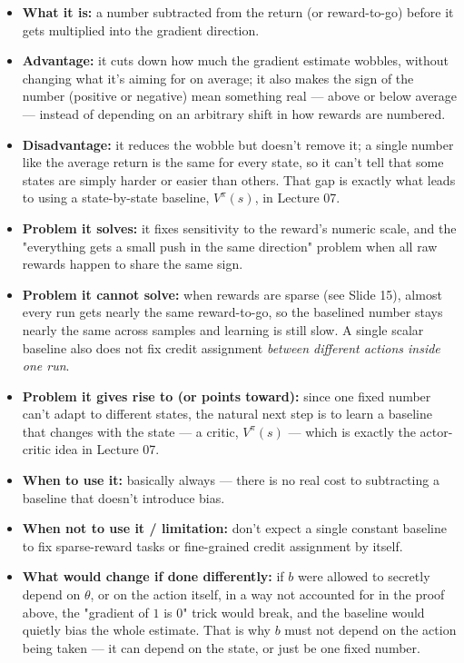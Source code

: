 \documentclass[11pt]{article}
\begin{document}
\begin{itemize}[leftmargin=*]
  \item \textbf{What it is:} a number subtracted from the return (or reward-to-go) before it gets multiplied into the gradient direction.
  \item \textbf{Advantage:} it cuts down how much the gradient estimate wobbles, without changing what it's aiming for on average; it also makes the sign of the number (positive or negative) mean something real --- above or below average --- instead of depending on an arbitrary shift in how rewards are numbered.
  \item \textbf{Disadvantage:} it reduces the wobble but doesn't remove it; a single number like the average return is the same for every state, so it can't tell that some states are simply harder or easier than others. That gap is exactly what leads to using a state-by-state baseline, $V^\pi(s)$, in Lecture 07.
  \item \textbf{Problem it solves:} it fixes sensitivity to the reward's numeric scale, and the "everything gets a small push in the same direction" problem when all raw rewards happen to share the same sign.
  \item \textbf{Problem it cannot solve:} when rewards are sparse (see Slide 15), almost every run gets nearly the same reward-to-go, so the baselined number stays nearly the same across samples and learning is still slow. A single scalar baseline also does not fix credit assignment \emph{between different actions inside one run}.
  \item \textbf{Problem it gives rise to (or points toward):} since one fixed number can't adapt to different states, the natural next step is to learn a baseline that changes with the state --- a critic, $V^\pi(s)$ --- which is exactly the actor-critic idea in Lecture 07.
  \item \textbf{When to use it:} basically always --- there is no real cost to subtracting a baseline that doesn't introduce bias.
  \item \textbf{When not to use it / limitation:} don't expect a single constant baseline to fix sparse-reward tasks or fine-grained credit assignment by itself.
  \item \textbf{What would change if done differently:} if $b$ were allowed to secretly depend on $\theta$, or on the action itself, in a way not accounted for in the proof above, the "gradient of $1$ is $0$" trick would break, and the baseline would quietly bias the whole estimate. That is why $b$ must not depend on the action being taken --- it can depend on the state, or just be one fixed number.
\end{itemize}
\end{document}
